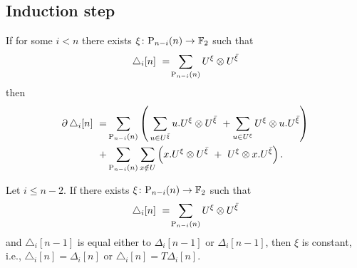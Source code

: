 
\subsection{Induction step}

\begin{lemma} \label{l:boundary triangle}
	If for some $i < n$ there exists $\xi \colon \mathrm{P}_{n-i}(n) \to {\mathbb{F}_2}$ such that
	\[
	\triangle_i [n]\ =\! \sum_{\mathrm{P}_{n-i}(n)} {U^{\xi}} \otimes {U^{{\bar{\xi}}}}
	\]
	then
	\begin{align*}
	\label{equation: boundary of triangle}
	\bd \triangle_i [n]\ = &
	\sum_{\P_{n-i}(n)} \left( \, \sum_{u \in U^\barxi} u.U^\xi \ot U^\barxi \ +
	\sum_{u \in U^\xi} U^\xi \ot u.U^\barxi \right) \\ + &
	\sum_{\P_{n-i}(n)} \sum_{x \notin U} \left( x.U^\xi \ot U^\barxi \ +\ U^\xi \ot {x.U^\barxi} \right).
	\end{align*}
\end{lemma}

\begin{lemma}
	Let $i \leq n-2$.
	If there exists $\xi \colon \mathrm{P}_{n-i}(n) \to {\mathbb{F}_2}$ such that
	\[
	\triangle_i [n]\ =\! \sum_{\mathrm{P}_{n-i}(n)} {U^{\xi}} \otimes {U^{{\bar{\xi}}}}
	\]
	and $\triangle_i [n-1]$ is equal either to $\Delta_i [n-1]$ or $\Delta_i [n-1]$, then $\xi$ is constant, i.e., $\triangle_i [n] = \Delta_i [n]$ or $\triangle_i [n] = T \Delta_i [n]$.
\end{lemma}

